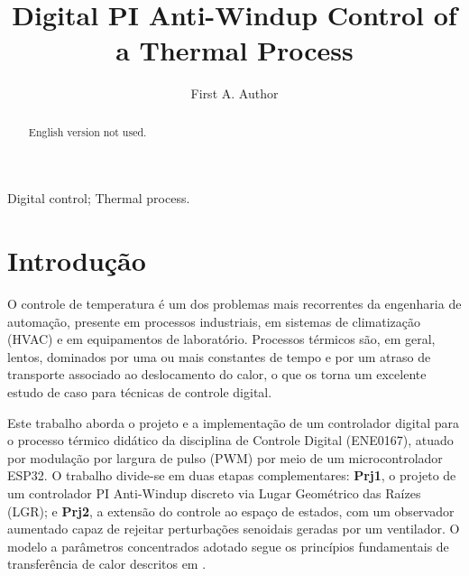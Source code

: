 \documentclass[a4paper]{ifacconf}
\begin{document}
\begin{frontmatter}






\end{frontmatter}
\else
\begin{frontmatter}
\title{Digital PI Anti-Windup Control of a Thermal Process}
\author[First]{First A. Author}
\address[First]{Universidade de Brasília}
\begin{abstract}
English version not used.
\end{abstract}
\begin{keyword}
Digital control; Thermal process.
\end{keyword}
\end{frontmatter}
\fi



\section{Introdução}

O controle de temperatura é um dos problemas mais recorrentes da engenharia de automação, presente em processos industriais, em sistemas de climatização (HVAC) e em equipamentos de laboratório. Processos térmicos são, em geral, lentos, dominados por uma ou mais constantes de tempo e por um atraso de transporte associado ao deslocamento do calor, o que os torna um excelente estudo de caso para técnicas de controle digital.

Este trabalho aborda o projeto e a implementação de um controlador digital para o processo térmico didático da disciplina de Controle Digital (ENE0167), atuado por modulação por largura de pulso (PWM) por meio de um microcontrolador ESP32. O trabalho divide-se em duas etapas complementares: \textbf{Prj1}, o projeto de um controlador PI Anti-Windup discreto via Lugar Geométrico das Raízes (LGR); e \textbf{Prj2}, a extensão do controle ao espaço de estados, com um observador aumentado capaz de rejeitar perturbações senoidais geradas por um ventilador. O modelo a parâmetros concentrados adotado segue os princípios fundamentais de transferência de calor descritos em \cite{Bauchspiess:2006}.
\end{document}
